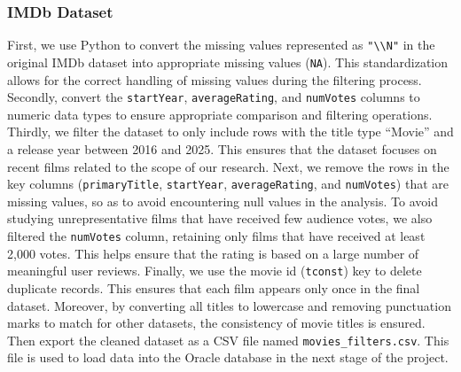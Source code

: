 \documentclass[12pt]{article}
\begin{document}
\subsubsection{IMDb Dataset}
First, we use Python to convert the missing values represented as \texttt{"\textbackslash\textbackslash N"} in the original IMDb dataset into appropriate missing values (\texttt{NA}). This standardization allows for the correct handling of missing values during the filtering process. Secondly, convert the \texttt{startYear}, \texttt{averageRating}, and \texttt{numVotes} columns to numeric data types to ensure appropriate comparison and filtering operations. Thirdly, we filter the dataset to only include rows with the title type ``Movie'' and a release year between 2016 and 2025. This ensures that the dataset focuses on recent films related to the scope of our research. Next, we remove the rows in the key columns (\texttt{primaryTitle}, \texttt{startYear}, \texttt{averageRating}, and \texttt{numVotes}) that are missing values, so as to avoid encountering null values in the analysis. To avoid studying unrepresentative films that have received few audience votes, we also filtered the \texttt{numVotes} column, retaining only films that have received at least 2,000 votes. This helps ensure that the rating is based on a large number of meaningful user reviews. Finally, we use the movie id (\texttt{tconst}) key to delete duplicate records. This ensures that each film appears only once in the final dataset. Moreover, by converting all titles to lowercase and removing punctuation marks to match for other datasets, the consistency of movie titles is ensured. Then export the cleaned dataset as a CSV file named \texttt{movies\_filters.csv}. This file is used to load data into the Oracle database in the next stage of the project.
\end{document}
